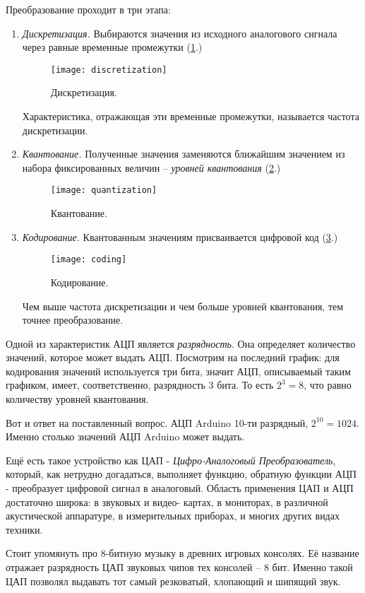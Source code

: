 \documentclass[../sparc.tex]{subfiles}
\begin{document}
Преобразование проходит в три этапа:
\begin{enumerate}
\item \emph{Дискретизация.} Выбираются значения из исходного аналогового сигнала через
  равные временные промежутки (\ref{fig:discretization}.)

  \begin{figure}[h]
    \caption{Дискретизация.}
    \label{fig:discretization}
    \texttt{[image: discretization]}
    \centering
  \end{figure}

  Характеристика, отражающая эти временные промежутки, называется частота
  дискретизации.
\item \emph{Квантование.} Полученные значения заменяются ближайшим значением из
  набора фиксированных величин -- \emph{уровней квантования}
  (\ref{fig:quantization}.)

  \begin{figure}[h]
    \caption{Квантование.}
    \label{fig:quantization}
    \texttt{[image: quantization]}
    \centering
  \end{figure}

\item \emph{Кодирование.} Квантованным значениям присваивается цифровой код
  (\ref{fig:coding}.)

  \begin{figure}[h]
    \caption{Кодирование.}
    \label{fig:coding}
    \texttt{[image: coding]}
    \centering
  \end{figure}

  Чем выше частота дискретизации и чем больше уровней квантования, тем точнее
  преобразование.

\end{enumerate}

Одной из характеристик АЦП является \emph{разрядность}. Она определяет
количество значений, которое может выдать АЦП. Посмотрим на последний график:
для кодирования значений используется три бита, значит АЦП, описываемый таким
графиком, имеет, соответственно, разрядность 3 бита. То есть $ 2^3 = 8 $, что
равно количеству уровней квантования.

Вот и ответ на поставленный вопрос. АЦП Arduino 10-ти разрядный, $2^{10} = 1024$.
Именно столько значений АЦП Arduino может выдать.

Ещё есть такое устройство как ЦАП - \emph{Цифро-Аналоговый Преобразователь},
который, как нетрудно догадаться, выполняет функцию, обратную функции АЦП -
преобразует цифровой сигнал в аналоговый. Область применения ЦАП и АЦП
достаточно широка: в звуковых и видео- картах, в мониторах, в различной
акустической аппаратуре, в измерительных приборах, и многих других видах
техники.

Стоит упомянуть про 8-битную музыку в древних игровых консолях. Её название
отражает разрядность ЦАП звуковых чипов тех консолей -- 8 бит. Именно такой ЦАП
позволял выдавать тот самый резковатый, хлопающий и шипящий звук.
\end{document}
